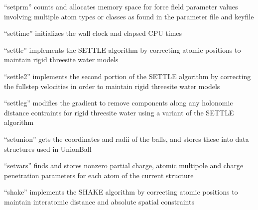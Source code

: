 \documentclass[letterpaper,11pt,english]{sphinxmanual}
\begin{document}
\sphinxAtStartPar
“setprm” counts and allocates memory space for force field parameter values involving multiple atom types or classes as found in the parameter file and keyfile

\sphinxAtStartPar
{}

\sphinxAtStartPar
{}

\sphinxAtStartPar
{}

\sphinxAtStartPar
“settime” initializes the wall clock and elapsed CPU times

\sphinxAtStartPar
{}

\sphinxAtStartPar
“settle” implements the SETTLE algorithm by correcting atomic positions to maintain rigid three\sphinxhyphen{}site water models

\sphinxAtStartPar
{}

\sphinxAtStartPar
“settle2” implements the second portion of the SETTLE algorithm by correcting the full\sphinxhyphen{}step velocities in order to maintain rigid three\sphinxhyphen{}site water models

\sphinxAtStartPar
{}

\sphinxAtStartPar
“settleg” modifies the gradient to remove components along any holonomic distance contraints for rigid three\sphinxhyphen{}site water using a variant of the SETTLE algorithm

\sphinxAtStartPar
{}

\sphinxAtStartPar
“setunion” gets the coordinates and radii of the balls, and stores these into data structures used in UnionBall

\sphinxAtStartPar
{}

\sphinxAtStartPar
{}

\sphinxAtStartPar
“setvars” finds and stores nonzero partial charge, atomic multipole and charge penetration parameters for each atom of the current structure

\sphinxAtStartPar
{}

\sphinxAtStartPar
{}

\sphinxAtStartPar
“shake” implements the SHAKE algorithm by correcting atomic positions to maintain interatomic distance and absolute spatial constraints
\end{document}
